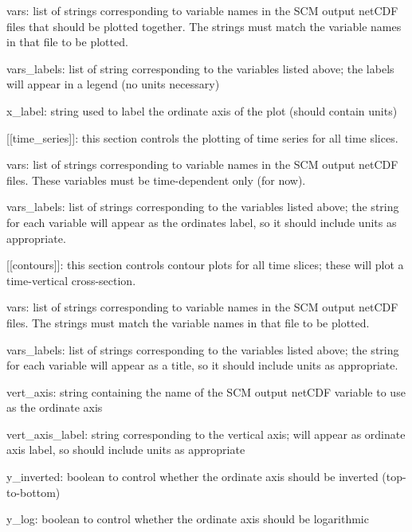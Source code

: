 \begin{DoxyItemize}
\begin{DoxyItemize}
\begin{DoxyItemize}
\begin{DoxyItemize}
\begin{DoxyItemize}
\item vars\+: list of strings corresponding to variable names in the S\+CM output net\+C\+DF files that should be plotted together. The strings must match the variable names in that file to be plotted.
\item vars\+\_\+labels\+: list of string corresponding to the variables listed above; the labels will appear in a legend (no units necessary)
\item x\+\_\+label\+: string used to label the ordinate axis of the plot (should contain units) 
\end{DoxyItemize}
\item \mbox{[}\mbox{[}time\+\_\+series\mbox{]}\mbox{]}\+: this section controls the plotting of time series for all time slices.
\begin{DoxyItemize}
\item vars\+: list of strings corresponding to variable names in the S\+CM output net\+C\+DF files. These variables must be time-\/dependent only (for now).
\item vars\+\_\+labels\+: list of strings corresponding to the variables listed above; the string for each variable will appear as the ordinate\textquotesingle{}s label, so it should include units as appropriate. 
\end{DoxyItemize}
\item \mbox{[}\mbox{[}contours\mbox{]}\mbox{]}\+: this section controls contour plots for all time slices; these will plot a time-\/vertical cross-\/section.
\begin{DoxyItemize}
\item vars\+: list of strings corresponding to variable names in the S\+CM output net\+C\+DF files. The strings must match the variable names in that file to be plotted.
\item vars\+\_\+labels\+: list of strings corresponding to the variables listed above; the string for each variable will appear as a title, so it should include units as appropriate.
\item vert\+\_\+axis\+: string containing the name of the S\+CM output net\+C\+DF variable to use as the ordinate axis
\item vert\+\_\+axis\+\_\+label\+: string corresponding to the vertical axis; will appear as ordinate axis label, so should include units as appropriate
\item y\+\_\+inverted\+: boolean to control whether the ordinate axis should be inverted (top-\/to-\/bottom)
\item y\+\_\+log\+: boolean to control whether the ordinate axis should be logarithmic

\end{DoxyItemize}
\end{DoxyItemize}
\end{DoxyItemize}
\end{DoxyItemize}
\end{DoxyItemize}
